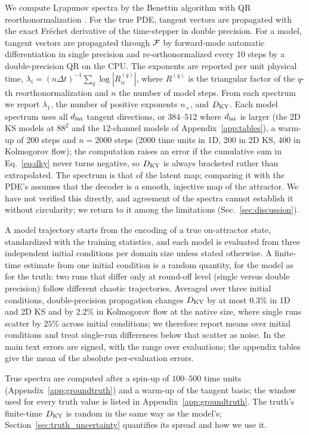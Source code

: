 We compute Lyapunov spectra by the Benettin algorithm with QR
reorthonormalization \citep{benettin1980}. For the true PDE, tangent
vectors are propagated with the exact Fr\'echet derivative of the
time-stepper in double precision. For a model, tangent vectors are
propagated through $\mathcal{F}$ by forward-mode automatic differentiation in
single precision and re-orthonormalized every 10 steps by a
double-precision QR on the CPU. The exponents are reported per unit
physical time, $\lambda_i = (n\Delta t)^{-1}\sum_{q}\log|R^{(q)}_{ii}|$,
where $R^{(q)}$ is the triangular factor of the $q$-th reorthonormalization
and $n$ the number of model steps. From each spectrum we report
$\lambda_1$, the number of positive exponents $n_+$, and $D_{\mathrm{KY}}$. Each
model spectrum uses all $d_{\mathrm{lat}}$
tangent directions, or $384$--$512$ where $d_{\mathrm{lat}}$ is larger (the 2D KS models at
$88^2$ and the 12-channel models of Appendix~\ref{app:tables}), a warm-up of 200 steps and $n=2000$ steps (2000 time
units in 1D, 200 in 2D KS, 400 in Kolmogorov flow); the computation
raises an error if the cumulative sum in Eq.~\eqref{eq:dky} never turns
negative, so $D_{\mathrm{KY}}$ is always bracketed rather than extrapolated. The
spectrum is that of the latent map; comparing it with the PDE's assumes
that the decoder is a smooth, injective map of the attractor. We have not
verified this directly, and agreement of the spectra cannot establish it
without circularity; we return to it among the limitations
(Sec.~\ref{sec:discussion}).

A model trajectory starts from the encoding of a true on-attractor
state, standardized with the training statistics, and each model is
evaluated from three independent initial conditions per domain size
unless stated otherwise. A finite-time estimate from one initial
condition is a random quantity, for the model as for the truth: two runs
that differ only at round-off level (single versus double precision)
follow different chaotic trajectories. Averaged over three initial
conditions, double-precision propagation changes $D_{\mathrm{KY}}$ by at most
$0.3\%$ in 1D and 2D KS and by $2.2\%$ in Kolmogorov flow at the native
size, where single runs scatter by $25\%$ across initial conditions; we
therefore report means over initial conditions and treat single-run
differences below that scatter as noise. In the main text errors are
signed, with the range over evaluations; the appendix tables give the
mean of the absolute per-evaluation errors.

True spectra are computed after a spin-up of $100$--$500$ time units
(Appendix~\ref{app:groundtruth}) and a warm-up of the tangent basis; the window used for every truth value is
listed in Appendix~\ref{app:groundtruth}. The truth's finite-time $D_{\mathrm{KY}}$ is
random in the same way as the model's; Section~\ref{sec:truth_uncertainty}
quantifies its spread and how we use it.


